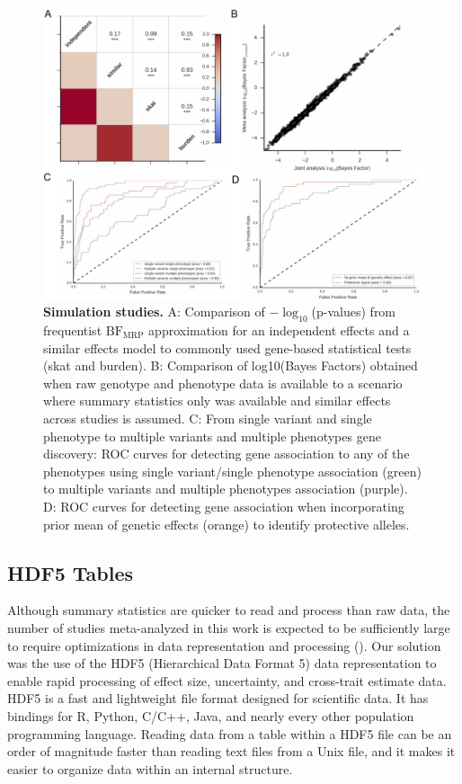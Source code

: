 \begin{figure}[!h]
\includegraphics[width=\textwidth]{../figures/final/Figure_02.pdf}
\caption{{\bf Simulation studies.}
A: Comparison of $-\log_{10}$(p-values) from frequentist $\textrm{BF}_{\textrm{MRP}}$ approximation for an independent effects and a similar effects model to commonly used gene-based statistical tests (skat and burden). B: Comparison of log10(Bayes Factors) obtained when raw genotype and phenotype data is available to a scenario where summary statistics only was available and similar effects across studies is assumed. C: From single variant and single phenotype to multiple variants and multiple phenotypes gene discovery: ROC curves for detecting gene association to any of the phenotypes using single variant/single phenotype association (green) to multiple variants and multiple phenotypes association (purple). D: ROC curves for detecting gene association when incorporating prior mean of genetic effects (orange) to identify protective alleles.}
\label{simresults}
\end{figure}

\subsection*{HDF5 Tables}
Although summary statistics are quicker to read and process than raw data, the number of studies meta-analyzed in this work is expected to be sufficiently large to require optimizations in data representation and processing (). Our solution was the use of the HDF5 (Hierarchical Data Format 5) data representation to enable rapid processing of effect size, uncertainty, and cross-trait estimate data. HDF5 is a fast and lightweight file format designed for scientific data. It has bindings for R, Python, C/C++, Java, and nearly every other population programming language. Reading data from a table within a HDF5 file can be an order of magnitude faster than reading text files from a Unix file, and it makes it easier to organize data within an internal structure.

